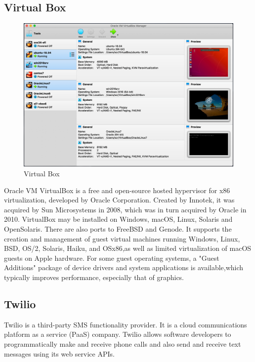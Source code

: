 \newpage

\subsection{Virtual Box}

\begin{figure}[h]
		\centering
	\includegraphics[width=120mm,scale=1]{51}
	\caption{Virtual Box}
	\label{Virtual Box}
	
\end{figure}

Oracle VM VirtualBox is a free and open-source hosted hypervisor for x86 virtualization, developed by Oracle Corporation. Created by Innotek, it was acquired by Sun Microsystems in 2008, which was in turn acquired by Oracle in 2010. VirtualBox may be installed on Windows, macOS, Linux, Solaris and OpenSolaris. There are also ports to FreeBSD and Genode. It supports the creation and management of guest virtual machines running Windows, Linux, BSD, OS/2, Solaris, Haiku, and OSx86,as well as limited virtualization of macOS guests on Apple hardware. For some guest operating systems, a "Guest Additions" package of device drivers and system applications is available,which typically improves performance, especially that of graphics.

\newpage

\subsection{Twilio}



\hspace{0.5cm} Twilio is a third-party SMS functionality provider. It is a cloud communications platform as a service (PaaS) company. Twilio allows software developers to programmatically make and receive phone calls and also send and receive text messages using its web service APIs.

